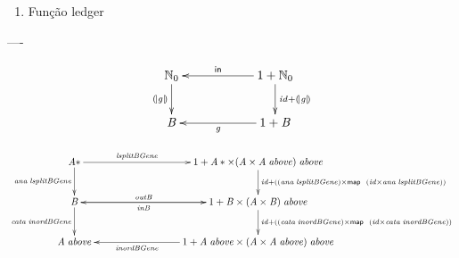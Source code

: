 \documentclass[a4paper]{article}
\newcommand{\Conid}[1]{\mathit{#1}}
\newcommand{\Varid}[1]{\mathit{#1}}
\begin{document}
\begin{enumerate}
\item Função ledger





\end{enumerate}

----

\begin{eqnarray*}
\xymatrix@C=2cm{
    \ensuremath{\N_0}
           \ar[d]_-{\ensuremath{\cata{\Varid{g}}}}
&
    \ensuremath{\mathrm{1}\mathbin{+}\N_0}
           \ar[d]^{\ensuremath{\Varid{id}\mathbin{+}\cata{\Varid{g}}}}
           \ar[l]_-{\ensuremath{\mathsf{in}}}
\\
     \ensuremath{\mathit B}
&
     \ensuremath{\mathrm{1}\mathbin{+}\mathit B}
           \ar[l]^-{\ensuremath{\Varid{g}}}
}
\end{eqnarray*}




\begin{eqnarray*}
\xymatrix@C=3cm{
   \ensuremath{\Conid{A}\mathbin{*}}
          \ar[d]_-{\ensuremath{\Varid{ana}\;\Varid{lsplitBGene}}}
           \ar[r]^-{\ensuremath{\Varid{lsplitBGene}}}
&
   \ensuremath{\mathrm{1}\mathbin{+}\Conid{A}\mathbin{*}\times(\Conid{A}\times\Conid{A}\;\Varid{above})\;\Varid{above}}
          \ar[d]^{\ensuremath{\Varid{id}\mathbin{+}((\Varid{ana}\;\Varid{lsplitBGene})\times\map \;(\Varid{id}\times\Varid{ana}\;\Varid{lsplitBGene}))}}
\\
    \ensuremath{\mathit B}
       \ar[d]_-{\ensuremath{\Varid{cata}\;\Varid{inordBGene}}}
       \ar[r]^-{\ensuremath{\Varid{outB}}}
&
    \ensuremath{\mathrm{1}\mathbin{+}\mathit B\times(\Conid{A}\times\mathit B)\;\Varid{above}}
          \ar[l]^-{\ensuremath{\Varid{inB}}}
           \ar[d]^{\ensuremath{\Varid{id}\mathbin{+}((\Varid{cata}\;\Varid{inordBGene})\times\map \;(\Varid{id}\times\Varid{cata}\;\Varid{inordBGene}))}}
\\
   \ensuremath{\Conid{A}\;\Varid{above}}
&
   \ensuremath{\mathrm{1}\mathbin{+}\Conid{A}\;\Varid{above}\times(\Conid{A}\times\Conid{A}\;\Varid{above})\;\Varid{above}}
       \ar[l]^-{\ensuremath{\Varid{inordBGene}}}
}
\end{eqnarray*}
\end{document}
